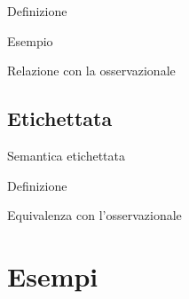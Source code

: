 \documentclass{beamer}
\theoremstyle{plain}
\theoremstyle{definition}
\theoremstyle{remark}
\begin{document}
\begin{frame}{Definizione}
  
\end{frame}

\begin{frame}{Esempio}
  
\end{frame}

\begin{frame}{Relazione con la osservazionale}
  
\end{frame}

\subsection{Etichettata}

\begin{frame}{Semantica etichettata}
  
\end{frame}

\begin{frame}{Definizione}
  
\end{frame}

\begin{frame}{Equivalenza con l'osservazionale}
  
\end{frame}

\section{Esempi}

\begin{frame}
  
\end{frame}
\end{document}
